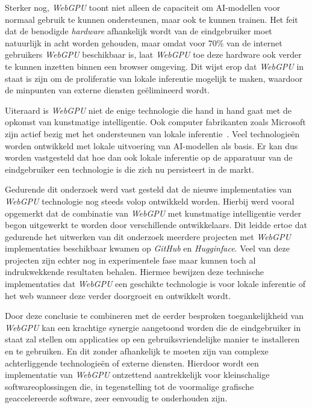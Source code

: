\bigbreak{}

Sterker nog, \textit{WebGPU} toont niet alleen de capaciteit om  AI-modellen voor normaal gebruik te kunnen ondersteunen, maar ook te kunnen trainen. Het feit dat de benodigde \textit{hardware} afhankelijk wordt van de eindgebruiker moet natuurlijk in acht worden gehouden, maar omdat voor 70\% van de internet gebruikers \textit{WebGPU} beschikbaar is, laat \textit{WebGPU} toe deze hardware ook verder te kunnen inzetten binnen een browser omgeving. Dit wijst erop dat \textit{WebGPU} in staat is zijn om de proliferatie van lokale inferentie mogelijk te maken, waardoor de minpunten van externe diensten geëlimineerd wordt.

\bigbreak{}

Uiteraard is \textit{WebGPU} niet de enige technologie die hand in hand gaat met de opkomst van kunstmatige intelligentie. Ook computer fabrikanten zoals Microsoft zijn actief bezig met het ondersteunen van lokale inferentie~\autocite{Mehdi2024}. Veel technologieën worden ontwikkeld met lokale uitvoering van AI-modellen als basis. Er kan dus worden vastgesteld dat hoe dan ook lokale inferentie op de apparatuur van de eindgebruiker een technologie is die zich nu persisteert in de markt.

\bigbreak{}

Gedurende dit onderzoek werd vast gesteld dat de nieuwe implementaties van \textit{WebGPU} technologie nog steeds volop ontwikkeld worden. Hierbij werd vooral opgemerkt dat de combinatie van \textit{WebGPU} met kunstmatige intelligentie verder begon uitgewerkt te worden door verschillende ontwikkelaars. Dit leidde ertoe dat gedurende het uitwerken van dit onderzoek meerdere projecten met \textit{WebGPU} implementaties beschikbaar kwamen op \textit{GitHub} en \textit{Hugginface}. Veel van deze projecten zijn echter nog in experimentele fase maar kunnen toch al indrukwekkende resultaten behalen. Hiermee bewijzen deze technische implementaties dat \textit{WebGPU} een geschikte technologie is voor lokale inferentie of het web wanneer deze verder doorgroeit en ontwikkelt wordt. 

\bigbreak{}

Door deze conclusie te combineren met de eerder besproken toegankelijkheid van \textit{WebGPU} kan een krachtige synergie aangetoond worden die de eindgebruiker in staat zal stellen om applicaties op een gebruiksvriendelijke manier te installeren en te gebruiken. En dit zonder afhankelijk te moeten zijn van complexe achterliggende technologieën of externe diensten. Hierdoor wordt een implementatie van \textit{WebGPU} ontzettend aantrekkelijk voor kleinschalige softwareoplossingen die, in tegenstelling tot de voormalige grafische geaccelereerde software, zeer eenvoudig te onderhouden zijn.

